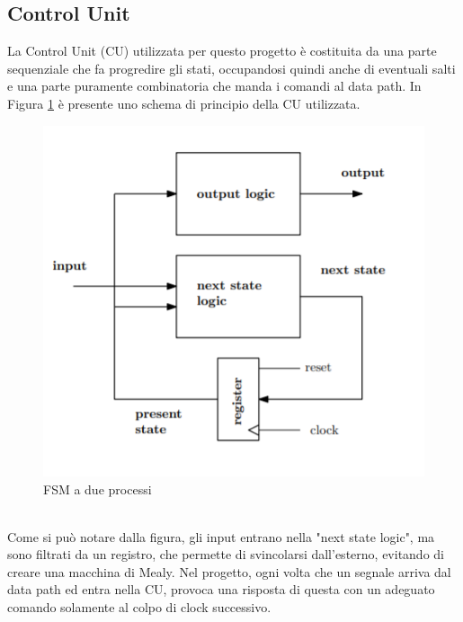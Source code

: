 \documentclass[a4paper, titlepage]{article}
\begin{document}
\subsection{Control Unit}
La Control Unit (CU) utilizzata per questo progetto è costituita da una parte sequenziale che fa progredire gli stati, occupandosi quindi anche di eventuali salti e una parte puramente combinatoria che manda i comandi al data path. In Figura \ref{fig:fsm} è presente uno schema di principio della CU utilizzata.
\begin{figure}[h]
\centering
\includegraphics[scale=0.6]{fsm_2processi}
\caption{FSM a due processi}
\label{fig:fsm}
\end{figure}\\
Come si può notare dalla figura, gli input entrano nella "next state logic", ma sono filtrati da un registro, che permette di svincolarsi dall'esterno, evitando di creare una macchina di Mealy. Nel progetto, ogni volta che un segnale arriva dal data path ed entra nella CU, provoca una risposta di questa con un adeguato comando solamente al colpo di clock successivo.
\newpage
\end{document}
